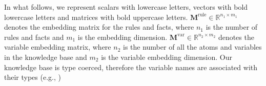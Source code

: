 In what follows, we represent scalars with lowercase letters, vectors with bold lowercase letters and matrices with bold uppercase letters. %
$\mathbf{M}^{\text{rule}} \in \mathbb{R}^{n_1 \times m_1}$ denotes the embedding matrix for the rules and facts, where $n_1$ is the number of rules and facts and $m_1$ is the embedding dimension. 
$\mathbf{M}^{\text{var}} \in \mathbb{R}^{n_2 \times m_2}$ denotes the variable embedding matrix, where $n_2$ is the number of all the atoms and variables in the knowledge base and $m_2$ is the variable embedding dimension. 
Our knowledge base is type coerced, therefore the variable names are associated with their types (e.g., )
